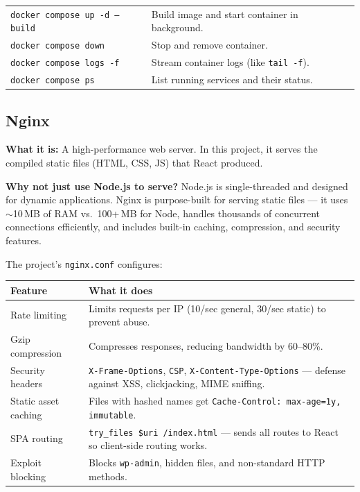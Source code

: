 \documentclass[11pt, letterpaper]{article}
\begin{document}
\begin{tipbox}
\begin{tabularx}{\textwidth}{lX}
\texttt{docker compose up -d --build} & Build image and start container in
background. \\
\texttt{docker compose down} & Stop and remove container. \\
\texttt{docker compose logs -f} & Stream container logs (like \texttt{tail -f}). \\
\texttt{docker compose ps} & List running services and their status. \\
\end{tabularx}
\end{tipbox}

\subsection{Nginx}

\textbf{What it is:} A high-performance web server. In this project, it serves
the compiled static files (HTML, CSS, JS) that React produced.

\textbf{Why not just use Node.js to serve?} Node.js is single-threaded and
designed for dynamic applications. Nginx is purpose-built for serving static
files --- it uses $\sim$10\,MB of RAM vs.\ 100+\,MB for Node, handles thousands
of concurrent connections efficiently, and includes built-in caching,
compression, and security features.

The project's \texttt{nginx.conf} configures:

\begin{center}
\begin{tabularx}{0.9\textwidth}{lX}
\toprule
\textbf{Feature} & \textbf{What it does} \\
\midrule
Rate limiting & Limits requests per IP (10/sec general, 30/sec static) to
                prevent abuse. \\
Gzip compression & Compresses responses, reducing bandwidth by 60--80\%. \\
Security headers & \texttt{X-Frame-Options}, \texttt{CSP},
                   \texttt{X-Content-Type-Options} --- defense against XSS,
                   clickjacking, MIME sniffing. \\
Static asset caching & Files with hashed names get \texttt{Cache-Control:
                        max-age=1y, immutable}. \\
SPA routing & \texttt{try\_files \$uri /index.html} --- sends all routes to
              React so client-side routing works. \\
Exploit blocking & Blocks \texttt{wp-admin}, hidden files, and non-standard
                   HTTP methods. \\
\bottomrule
\end{tabularx}
\end{center}
\end{document}
